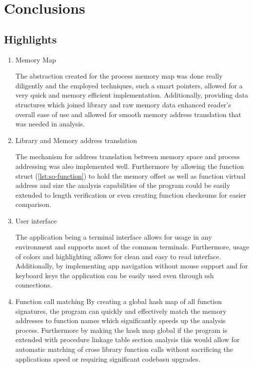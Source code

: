 \chapter{Conclusions}
\label{cha:conlusions}

\section{Highlights}

\begin{enumerate}
    \item{Memory Map} 
    
    The abstraction created for the process memory map was done really diligently and the employed techniques, such a smart pointers, allowed for a very quick and memory efficient implementation.
    Additionally, providing data structures which joined library and raw memory data enhanced reader's overall ease of use and allowed for smooth memory address translation that was needed in analysis. 

    \item{Library and Memory address translation}

    The mechanism for address translation between memory space and process addressing was also implemented well.
    Furthermore by allowing the function struct (\autoref{lst:so-function}) to hold the memory offset as well as function virtual address and size the analysis capabilities of the program could be easily extended to length verification or even creating function checksums for easier comparison.

    \item{User interface}

    The application being a terminal interface allows for usage in any environment and supports most of the common terminals. 
    Furthermore, usage of colors and highlighting allows for clean and easy to read interface.
    Additionally, by implementing app navigation without mouse support and for keyboard keys the application can be easily used even through ssh connections.

    \item {Function call matching}
    By creating a global hash map of all function signatures, the program can quickly and effectively match the memory addresses to function names which significantly speeds up the analysis process.
    Furthermore by making the hash map global if the program is extended with procedure linkage table section analysis this would allow for automatic matching of cross library function calls without sacrificing the applications speed or requiring significant codebasu upgrades.


\end{enumerate}
